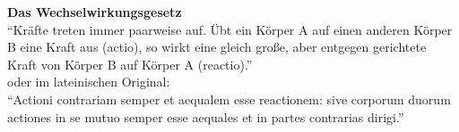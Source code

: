 
\begin{cbox}
	\textbf{Das Wechselwirkungsgesetz}\\
	``Kräfte treten immer paarweise auf. Übt ein Körper A auf einen anderen Körper B eine Kraft aus (actio), so wirkt eine gleich große, aber entgegen gerichtete Kraft von Körper B auf Körper A (reactio).''\\oder im lateinischen Original:\\
	``Actioni contrariam semper et aequalem esse reactionem: sive corporum duorum actiones in se mutuo semper esse aequales et in partes contrarias dirigi.''
\end{cbox}

